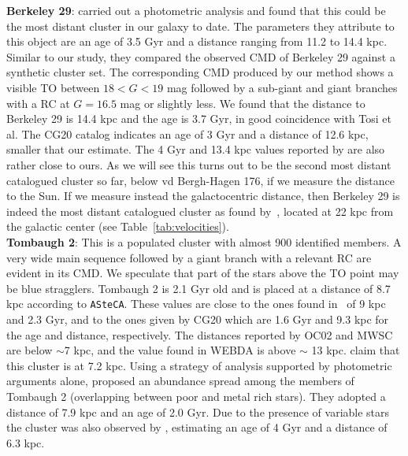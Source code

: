\documentclass[draft]{aa}
\begin{document}
\begin{appendix}
  \noindent \textbf{Berkeley 29}: \cite{Tosi_2004} carried out a photometric analysis
  and found that this could be the most distant cluster in our galaxy to date.
  The parameters they attribute to this object are an age of 3.5 Gyr and a
  distance ranging from 11.2 to 14.4 kpc.
  Similar to our study, they compared the observed CMD of Berkeley 29 against a
  synthetic cluster set. The corresponding CMD produced by our method
  shows a visible TO between $18<G<19$ mag followed by a sub-giant and giant
  branches with a RC at $G=16.5$ mag or slightly less. We found that the
  distance to Berkeley 29 is 14.4 kpc and the age is 3.7 Gyr, in good
  coincidence with Tosi et al. The CG20 catalog indicates an age of 3 Gyr and a
  distance of 12.6 kpc, smaller that our estimate. The 4 Gyr and 13.4
  kpc values reported by \cite{Frinchaboy_2006} are also rather close to ours.
  As we will see this turns out to be the second most
  distant catalogued cluster so far, below vd Bergh-Hagen 176, if we measure
  the distance to the Sun. If we measure instead the galactocentric distance,
  then Berkeley 29 is indeed the most distant catalogued cluster as found
  by~\cite{Tosi_2004}, located at 22 kpc from the galactic center (see
  Table~\ref{tab:velocities}).\\

  \noindent \textbf{Tombaugh 2}: This is a populated cluster with almost 900 identified
  members. A very wide main sequence followed by a giant branch with a relevant
  RC are evident in its CMD. We speculate that part of the stars
  above the TO point may be blue stragglers. Tombaugh 2 is 2.1 Gyr old and is
  placed at a distance of 8.7 kpc according to \texttt{ASteCA}. These values are
  close to the ones found in~\cite{Dias_2021} of 9 kpc and 2.3 Gyr, and
  to the ones given by CG20 which are 1.6 Gyr and 9.3 kpc for the age
  and distance, respectively. The distances reported by OC02 and MWSC are below
  $\sim$7 kpc, and the value found in WEBDA is above $\sim$ 13 kpc.
  \cite{Villanova_2010} claim that this cluster is at 7.2 kpc.
  Using a strategy of analysis supported by photometric arguments alone, 
  \cite{Frinchaboy_2008} proposed an abundance spread among the members of
  Tombaugh 2 (overlapping between poor and metal rich stars). They adopted a
  distance of 7.9 kpc and an age of 2.0 Gyr.
  Due to the presence of variable stars the cluster was also observed by
  \cite{Kubiak_1992}, estimating an age of 4 Gyr and a distance of 6.3 kpc.\\


\end{appendix}
\end{document}
